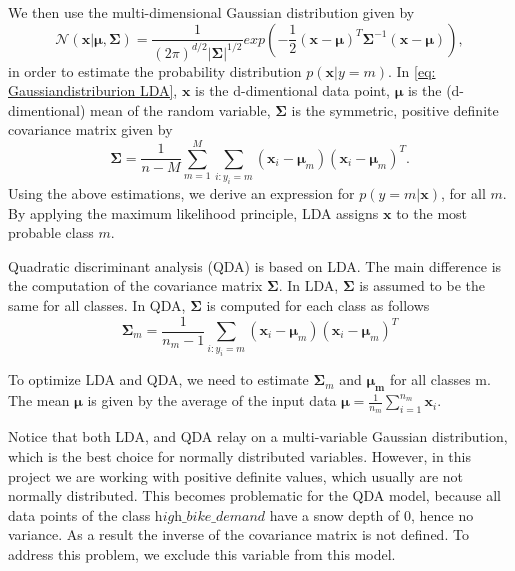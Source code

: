     We then use the multi-dimensional Gaussian distribution given by
        \begin{equation} \label{eq: Gaussiandistriburion LDA}
            \mathcal{N}(\mathbf{x}|\mathbf{\mu}, \mathbf{\Sigma}) = \frac{1}{(2 \pi)^{d/2} |\mathbf{\Sigma}|^{1/2}} 
            exp \left( -\frac{1}{2}(\mathbf{x}-\mathbf{\mu})^T \mathbf{\Sigma}^{-1} (\mathbf{x}-\mathbf{\mu})\right),
        \end{equation}
    in order to estimate the probability distribution $p(\mathbf{x}|y=m)$. In \eqref{eq: Gaussiandistriburion LDA}, $\mathbf{x}$ is the d-dimentional data point, $\mathbf{\mu}$ is the (d-dimentional) mean of the random variable,
    $\mathbf{\Sigma}$ is the symmetric, positive definite covariance matrix given by
        \begin{equation*}
            \mathbf{\Sigma} = \frac{1}{n-M}\sum_{m=1}^{M} \sum_{i:y_i=m} 
            (\mathbf{x}_i-\mathbf{\mu}_m)(\mathbf{x}_i-\mathbf{\mu}_m)^T.
        \end{equation*}
    Using the above estimations, we derive an expression for $p(y=m|\mathbf{x})$, for all $m$. By applying the maximum likelihood principle, LDA assigns $\mathbf{x}$ to the most probable class $m$. 
    
    Quadratic discriminant analysis (QDA) is based on LDA. The main difference is the computation of the covariance matrix $\mathbf{\Sigma}$. In LDA,  $\mathbf{\Sigma}$ is assumed to be the same for all classes. In QDA, $\mathbf{\Sigma}$ is computed for each class as follows
    \begin{equation*}
        \mathbf{\Sigma}_m = \frac{1}{n_m - 1} \sum_{i:y_i=m} 
        (\mathbf{x}_i-\mathbf{\mu}_m)(\mathbf{x}_i-\mathbf{\mu}_m)^T
    \end{equation*}
    
    To optimize LDA and QDA, we need to estimate $\mathbf{\Sigma}_m$ and $\mathbf{\mu_m}$ for all classes m. The mean $\mathbf{\mu}$ is given by the average of the input data $\mathbf{\mu} = \frac{1}{n_m}\sum_{i=1}^{n_m} \mathbf{x}_i$.

    Notice that both LDA, and QDA relay on a multi-variable Gaussian distribution, which is the best choice for normally distributed
    variables. However, in this project we are working with positive definite values, which usually are not normally distributed. This becomes problematic for the QDA model, because all data points of the class $\textit{high\_bike\_demand}$ have a
    snow depth of 0, hence no variance. As a result the inverse of the covariance matrix is not defined. To address this problem, we exclude this variable from this model. 
    

